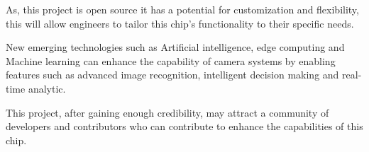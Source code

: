 As, this project is open source it has a potential for customization and flexibility, this will allow engineers to tailor this chip's functionality to their specific needs.

New emerging technologies such as Artificial intelligence, edge computing and Machine learning can enhance the capability of camera systems by enabling features such as advanced image recognition, intelligent decision making and real-time analytic.

This project, after gaining enough credibility, may attract a community of developers and contributors who can contribute to enhance the capabilities of this chip.